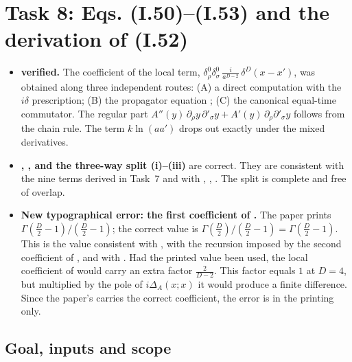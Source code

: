 \section{Task 8: Eqs. (I.50)--(I.53) and the derivation of (I.52)}
\label{sec:ch3-task8}

\begin{resultbox}
\begin{itemize}[leftmargin=12pt]
\item \textbf{ verified.} The coefficient of the local term, $\delta^0_\rho\delta^0_\sigma\,\tfrac{i}{a^{D-2}}\,\delta^D(x-x')$, was obtained along three independent routes:
(A) a direct computation with the $i\delta$ prescription; (B) the propagator equation ; (C) the canonical equal-time commutator.
The regular part $A''(y)\,\partial_\rho y\,\partial'_\sigma y+A'(y)\,\partial_\rho\partial'_\sigma y$ follows from the chain rule. The term $k\ln(aa')$ drops out exactly under
the mixed derivatives.
\item \textbf{, ,  and the three-way split (i)--(iii)} are correct. They are consistent with the nine terms derived in Task~7 and with
, , . The split is complete and free of overlap.
\item \textbf{New typographical error: the first coefficient of .} The paper prints $\Gamma(\tfrac D2-1)/(\tfrac D2-1)$; the correct value is
$\Gamma(\tfrac D2)/(\tfrac D2-1)=\Gamma(\tfrac D2-1)$. This is the value consistent with , with the recursion imposed by the second coefficient of ,
and with . Had the printed value been used, the local coefficient of  would carry an extra factor $\tfrac{2}{D-2}$. This factor equals $1$ at
$D=4$, but multiplied by the pole of $i\Delta_A(x;x)$ it would produce a finite difference. Since the paper's  carries the correct coefficient, the error is
in the printing only.
\end{itemize}
\end{resultbox}

\subsection{Goal, inputs and scope}

